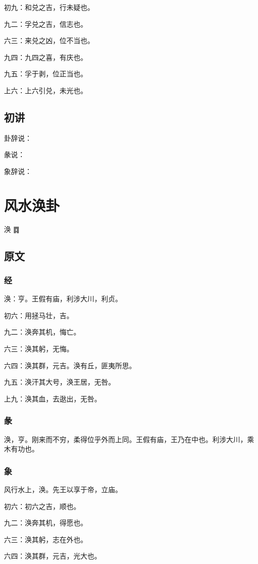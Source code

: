 \documentclass[12pt,oneside]{book}
\begin{document}
初九：和兑之吉，行未疑也。

九二：孚兑之吉，信志也。

六三：来兑之凶，位不当也。

九四：九四之喜，有庆也。

九五：孚于剥，位正当也。

上六：上六引兑，未光也。

\section{初讲}
卦辞说：

彖说：

象辞说：

\chapter{风水涣卦}
涣 {\Large ䷺}

\section{原文}

\subsection{经}
涣：亨。王假有庙，利涉大川，利贞。

初六：用拯马壮，吉。

九二：涣奔其机，悔亡。

六三：涣其躬，无悔。

六四：涣其群，元吉。涣有丘，匪夷所思。

九五：涣汗其大号，涣王居，无咎。

上九：涣其血，去逖出，无咎。

\subsection{彖}
涣，亨。刚来而不穷，柔得位乎外而上同。王假有庙，王乃在中也。利涉大川，乘木有功也。

\subsection{象}
风行水上，涣。先王以享于帝，立庙。

初六：初六之吉，顺也。

九二：涣奔其机，得愿也。

六三：涣其躬，志在外也。

六四：涣其群，元吉，光大也。
\end{document}
